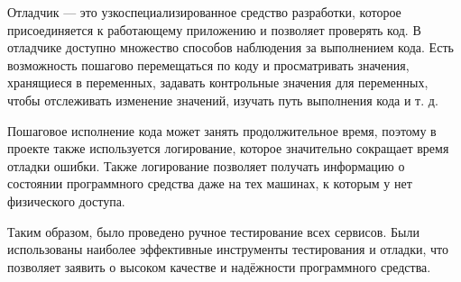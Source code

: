 Отладчик — это узкоспециализированное средство разработки, которое присоединяется к работающему приложению и позволяет проверять код. В отладчике доступно множество способов наблюдения за выполнением кода. Есть возможность пошагово перемещаться по коду и просматривать значения, хранящиеся в переменных, задавать контрольные значения для переменных, чтобы отслеживать изменение значений, изучать путь выполнения кода и т. д.

Пошаговое исполнение кода может занять продолжительное время, поэтому в проекте также используется логирование, которое значительно сокращает время отладки ошибки. Также логирование позволяет получать информацию о состоянии программного средства даже на тех машинах, к которым у нет физического доступа. 

Таким образом, было проведено ручное тестирование всех сервисов. Были использованы наиболее эффективные инструменты тестирования и отладки, что позволяет заявить о высоком качестве и надёжности программного средства.
